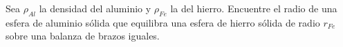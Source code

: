 \item Sea $\rho_{Al}$ la densidad del aluminio y $\rho_{Fe}$ la del hierro. Encuentre el radio de una esfera de aluminio sólida que equilibra una esfera de hierro sólida de radio $r_{Fe}$ sobre una balanza de brazos iguales.
